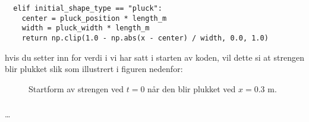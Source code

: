 \begin{verbatim}
  elif initial_shape_type == "pluck":
    center = pluck_position * length_m
    width = pluck_width * length_m
    return np.clip(1.0 - np.abs(x - center) / width, 0.0, 1.0)
\end{verbatim}

hvis du setter inn for verdi i vi har satt i starten av koden, vil dette si at strengen blir plukket slik som 
illustrert i figuren nedenfor:

\begin{figure}[h]
    \centering
    \caption{Startform av strengen ved $t=0$ når den blir plukket ved $x=0.3$ m.}
\end{figure}



\subsubsection{}
\dots
